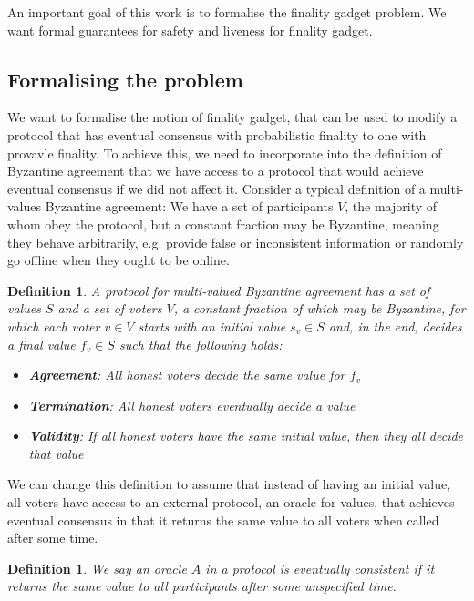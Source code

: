 \documentclass{article}
\newtheorem{definition}[theorem]{Definition}
\begin{document}
An important goal of this work is to formalise the finality gadget problem. We want formal guarantees for safety and liveness for finality gadget.

\subsection{Formalising the problem}

We want to formalise the notion of finality gadget, that can be used to modify a protocol that has eventual consensus with probabilistic finality to one with provavle finality.
To achieve this, we need to incorporate into the definition of Byzantine agreement that we have access to a protocol that would achieve eventual consensus if we did not affect it.
Consider a typical definition of a multi-values Byzantine agreement: 
We have a set of participants $V$, the majority of whom obey the protocol, but a constant fraction may be Byzantine, meaning they behave arbitrarily, e.g. provide false or inconsistent information or randomly go offline when they ought to be online.

\begin{definition} A protocol for {\em multi-valued Byzantine agreement} has a set of values $S$ and a set of voters $V$, a constant fraction of which may be Byzantine, for which each voter $v \in V$ starts with an initial value $s_v \in S$ and, in the end, decides a final value $f_v \in S$ such that the following holds:

\begin{itemize}
\item {\bf Agreement}: All honest voters decide the same value for $f_v$
\item {\bf Termination}: All honest voters eventually decide a value
\item {\bf Validity}: If all honest voters have the same initial value, then they all decide that value
\end{itemize}

\end{definition}

We can change this definition to assume that instead of having an initial value, all voters have access to an external protocol, an oracle for values, that achieves eventual consensus in that it returns the same value to all voters when called after some time.

\begin{definition}
We say an oracle $A$ in a protocol is {\em eventually consistent} if it returns the same value to all participants after some unspecified time.
\end{definition}
\end{document}
